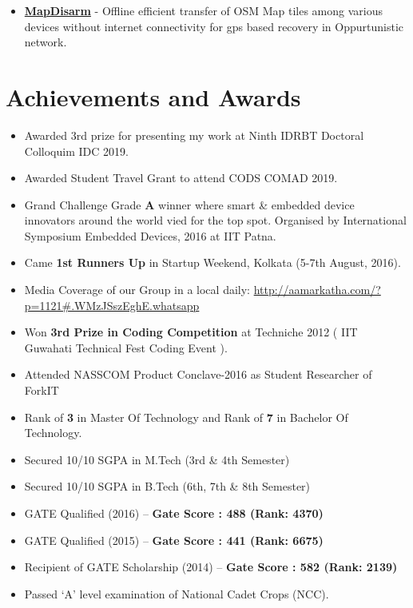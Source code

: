 \documentclass[margin, centered]{res}
\begin{document}
\begin{resume}
\begin{itemize}[leftmargin=*]
 \item \textbf{\href{https://github.com/hridaydutta123/MapDisarm}{MapDisarm}} - Offline efficient transfer of OSM Map tiles among various devices without internet connectivity for gps based recovery in Oppurtunistic network.
\end{itemize}

\section{Achievements and Awards}
\begin{itemize}[leftmargin=*]
 \item Awarded 3rd prize for presenting my work at Ninth IDRBT Doctoral Colloquim IDC 2019.
 \item Awarded Student Travel Grant to attend CODS COMAD 2019.
 \item Grand Challenge Grade \textbf{A} winner where smart \& embedded device innovators around the world vied for the top spot. Organised by International Symposium Embedded Devices, 2016 at IIT Patna.
 \item Came \textbf{1st Runners Up} in Startup Weekend, Kolkata (5-7th August, 2016).
 \item Media Coverage of our Group in a local daily: \url{http://aamarkatha.com/?p=1121#.WMzJSszEghE.whatsapp}
 \item Won \textbf{3rd Prize in Coding Competition} at Techniche 2012 ( IIT Guwahati Technical Fest Coding Event ).
 \item Attended NASSCOM Product Conclave-2016 as Student Researcher of ForkIT
 \item Rank of \textbf{3} in Master Of Technology and Rank of \textbf{7} in Bachelor Of Technology.
 \item Secured 10/10 SGPA in M.Tech (3rd \& 4th Semester)
 \item Secured 10/10 SGPA in B.Tech (6th, 7th \& 8th Semester)
 \item GATE Qualified (2016) – \textbf{Gate Score : 488 (Rank: 4370) }
 \item GATE Qualified (2015) – \textbf{Gate Score : 441 (Rank: 6675) }
 \item Recipient of GATE Scholarship (2014) – \textbf{Gate Score : 582 (Rank: 2139) }

 \item Passed `A' level examination of National Cadet Crops (NCC).
\end{itemize}


\end{resume}
\end{document}
